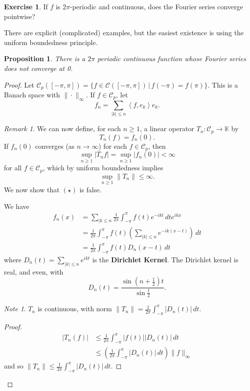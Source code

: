 \documentclass[10pt, oneside, reqno]{amsart}
\theoremstyle{plain}%
\newtheorem{prop}[thm]{Proposition}
\theoremstyle{definition}
\newtheorem{exer}[thm]{Exercise}
\theoremstyle{remark}
\newtheorem*{rem}{Remark}
\newtheorem*{note}{Note}
\newcommand{\given}{ \, | \,}
\newcommand{\K}{\mathbb{K}}
\newcommand{\iprod}[1]{\left\langle #1 \right\rangle}
\begin{document}
\begin{exer}
    If $f$ is $2\pi$-periodic and continuous, does the Fourier series converge pointwise?  
\end{exer}

There are explicit (complicated) examples, but the easiest existence is using the uniform boundedness principle.  

\begin{prop}
    There is a $2\pi$ periodic continuous function whose Fourier series does not converge at 0.  
\end{prop}
\begin{proof}
    Let $\mathcal{C}_p([-\pi, \pi]) = \{ f \in \mathcal C([-\pi, \pi]) \given f(-\pi) = f(\pi) \}.$  This is a Banach space with $\| \cdot \|_\infty $.  If $f \in \mathcal C_p$, let \[
        f_n = \sum_{|k | \leq n} \iprod{f, e_k} e_k.
    \]
    
\begin{rem}
    We can now define, for each $n \geq 1$, a linear operator $T_n : \mathcal C_p \rightarrow \K$ by \[
        T_n(f) = f_n(0). 
    \]  If $f_n(0)$ converges (as $ n \rightarrow \infty$) for each $f \in \mathcal C_p$, then \[
        \sup_{n \geq 1} |T_n f | = \sup_{n \geq 1} |f_n(0)| < \infty
    \] for all $f \in \mathcal C_p$, which by uniform boundedness implies \[
        \sup_{n \geq 1} \| T_n \| \leq \infty \tag{$\star$}.
    \]  
    We now show that $(\star)$ is false.
\end{rem}
We have \begin{align*}
    f_n(x)  &= \sum_{| k \leq n} \frac{1}{2 \pi} \int_{-\pi}^\pi f(t) e^{-ikt} \, dt e^{ikx}  \\
            &= \frac{1}{2\pi} \int_{-\pi}^\pi f(t) \left( \sum_{|k| \leq n} e^{-ik(x-t)} \right) \, dt \\
            &= \frac{1}{2 \pi} \int_{-\pi}^\pi f(t) D_n(x-t) \, dt 
\end{align*} where $D_n(t) = \sum_{|k| \leq n} e^{ikt}$ is the \textbf{Dirichlet Kernel}.  The Dirichlet kernel is real, and even, with \[
    D_n(t) = \frac{\sin(n+\frac{1}{2}) t}{\sin \frac{t}{2}}.  
\]  

\begin{note}
    $T_n$ is continuous, with norm $\| T_n \| = \frac{1}{2\pi} \int_{-\pi}^\pi |D_n(t) | \, dt$.
\end{note}
\begin{proof}
    \begin{align*}
        |T_n(f)| &\leq \frac{1}{2\pi} \int_{-\pi}^\pi |f(t)| |D_n(t)| \, dt \\
                &\leq \left( \frac{1}{2\pi} \int_{-\pi}^\pi |D_n(t)| \, dt \right) \| f\|_\infty
    \end{align*} and so $\|T_n \| \leq \frac{1}{2\pi} \int_{-\pi}^\pi |D_n(t)| \, dt$. 
    

\end{proof}
\end{proof}
\end{document}
